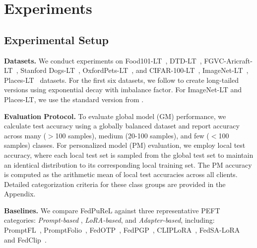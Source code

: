 \documentclass[10pt,twocolumn,letterpaper]{article}
\begin{document}
\section{Experiments}
\subsection{Experimental Setup}
\noindent \textbf{Datasets.} We conduct experiments on Food101-LT~\cite{food101}, DTD-LT~\cite{dtd}, FGVC-Aricraft-LT~\cite{fgvc}, Stanford Dogs-LT~\cite{dogs}, OxfordPets-LT~\cite{pets}, and CIFAR-100-LT~\cite{cifar}, ImageNet-LT~\cite{deng2009imagenet}, Places-LT~\cite{zhou2017places} datasets. For the first six datasets, we follow \cite{cao2019learning} to create long-tailed versions using exponential decay with imbalance factor. For ImageNet-LT and Places-LT, we use the standard version from \cite{imagenet-lt}. 


\noindent \textbf{Evaluation Protocol.} To evaluate global model (GM) performance, we calculate test accuracy using a globally balanced dataset and report accuracy across many ($>$100 samples), medium (20-100 samples), and few ($<$100 samples) classes. For personalized model (PM) evaluation, we employ local test accuracy, where each local test set is sampled from the global test set to maintain an identical distribution to its corresponding local training set. The PM accuracy is computed as the arithmetic mean of local test accuracies across all clients. Detailed categorization criteria for these class groups are provided in the Appendix.





\noindent \textbf{Baselines.} We compare FedPuReL against three representative PEFT categories: {} \textit{Prompt-based} , {} \textit{LoRA-based}, and {} \textit{Adapter-based}, including: PromptFL~\cite{guo2023promptfl}, PromptFolio~\cite{pan2024promptfolio}, FedOTP~\cite{li2024fedotp}, FedPGP~\cite{cui2024fedpgp}, CLIPLoRA~\cite{cliplora}, FedSA-LoRA~\cite{wang2024fedsalora} and FedClip~\cite{lu2023fedclip}. 

\end{document}
